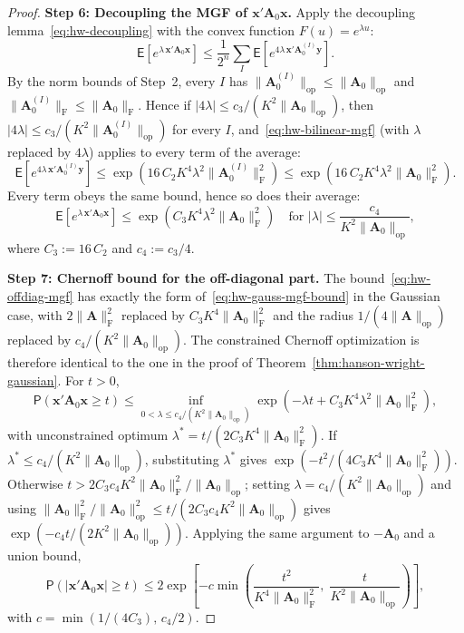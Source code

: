 \documentclass[14pt]{extarticle}
\theoremstyle{plain}
\theoremstyle{definition}
\theoremstyle{remark}
\newcommand\expc{\mathsf{E}}
\newcommand\prb{\mathsf{P}}
\newcommand{\by}{\mathbf{y}}
\newcommand{\bx}{\mathbf{x}}
\newcommand{\bA}{\mathbf{A}}
\newcommand{\opnorm}[1]{\|#1\|_{\mathrm{op}}}
\newcommand{\fnorm}[1]{\|#1\|_{\mathrm{F}}}
\begin{document}
\begin{proof}
\textbf{Step 6: Decoupling the MGF of $\bx'\bA_0\bx$.} Apply the decoupling lemma~\eqref{eq:hw-decoupling} with the convex function $F(u) = e^{\lambda u}$:
\[
\expc\!\left[e^{\lambda\,\bx'\bA_0\bx}\right] \leqslant \frac{1}{2^n}\sum_I \expc\!\left[e^{4\lambda\,\bx'\bA_0^{(I)}\by}\right].
\]
By the norm bounds of Step~2, every $I$ has $\opnorm{\bA_0^{(I)}} \leqslant \opnorm{\bA_0}$ and $\fnorm{\bA_0^{(I)}} \leqslant \fnorm{\bA_0}$. Hence if $|4\lambda| \leqslant c_3/(K^2\opnorm{\bA_0})$, then $|4\lambda| \leqslant c_3/(K^2\opnorm{\bA_0^{(I)}})$ for every $I$, and~\eqref{eq:hw-bilinear-mgf} (with $\lambda$ replaced by $4\lambda$) applies to every term of the average:
\[
\expc\!\left[e^{4\lambda\,\bx'\bA_0^{(I)}\by}\right] \leqslant \exp\!\left(16\,C_2 K^4\lambda^2\fnorm{\bA_0^{(I)}}^2\right) \leqslant \exp\!\left(16\,C_2 K^4\lambda^2\fnorm{\bA_0}^2\right).
\]
Every term obeys the same bound, hence so does their average:
\begin{equation}\label{eq:hw-offdiag-mgf}
\expc\!\left[e^{\lambda\,\bx'\bA_0\bx}\right] \leqslant \exp\!\left(C_3 K^4\lambda^2\fnorm{\bA_0}^2\right) \quad \text{for } |\lambda| \leqslant \frac{c_4}{K^2\opnorm{\bA_0}},
\end{equation}
where $C_3 := 16\,C_2$ and $c_4 := c_3/4$.

\textbf{Step 7: Chernoff bound for the off-diagonal part.} The bound~\eqref{eq:hw-offdiag-mgf} has exactly the form of~\eqref{eq:hw-gauss-mgf-bound} in the Gaussian case, with $2\fnorm{\bA}^2$ replaced by $C_3 K^4\fnorm{\bA_0}^2$ and the radius $1/(4\opnorm{\bA})$ replaced by $c_4/(K^2\opnorm{\bA_0})$. The constrained Chernoff optimization is therefore identical to the one in the proof of Theorem~\ref{thm:hanson-wright-gaussian}. For $t > 0$,
\[
\prb(\bx'\bA_0\bx \geqslant t) \leqslant \inf_{0 < \lambda \leqslant c_4/(K^2\opnorm{\bA_0})} \exp\!\left(-\lambda t + C_3 K^4\lambda^2\fnorm{\bA_0}^2\right),
\]
with unconstrained optimum $\lambda^* = t/(2C_3 K^4\fnorm{\bA_0}^2)$. If $\lambda^* \leqslant c_4/(K^2\opnorm{\bA_0})$, substituting $\lambda^*$ gives $\exp(-t^2/(4C_3 K^4\fnorm{\bA_0}^2))$. Otherwise $t > 2C_3 c_4 K^2\fnorm{\bA_0}^2/\opnorm{\bA_0}$; setting $\lambda = c_4/(K^2\opnorm{\bA_0})$ and using $\fnorm{\bA_0}^2/\opnorm{\bA_0}^2 \leqslant t/(2C_3 c_4 K^2\opnorm{\bA_0})$ gives $\exp(-c_4 t/(2K^2\opnorm{\bA_0}))$. Applying the same argument to $-\bA_0$ and a union bound,
\begin{equation}\label{eq:hw-offdiag-tail}
\prb(|\bx'\bA_0\bx| \geqslant t) \leqslant 2\exp\!\left[-c\min\!\left(\frac{t^2}{K^4\fnorm{\bA_0}^2},\; \frac{t}{K^2\opnorm{\bA_0}}\right)\right],
\end{equation}
with $c = \min(1/(4C_3),\, c_4/2)$.


\end{proof}
\end{document}

